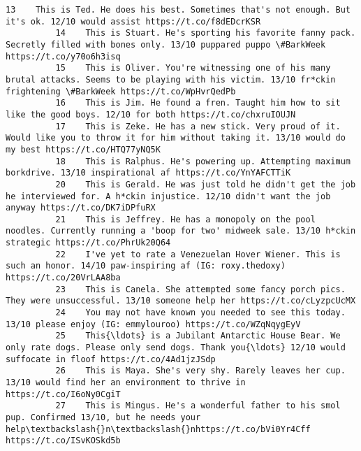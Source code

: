 \documentclass[11pt]{article}
\begin{document}
\begin{Verbatim}[commandchars=\\\{\}]
          13    This is Ted. He does his best. Sometimes that's not enough. But it's ok. 12/10 would assist https://t.co/f8dEDcrKSR                                                      
          14    This is Stuart. He's sporting his favorite fanny pack. Secretly filled with bones only. 13/10 puppared puppo \#BarkWeek https://t.co/y70o6h3isq                           
          15    This is Oliver. You're witnessing one of his many brutal attacks. Seems to be playing with his victim. 13/10 fr*ckin frightening \#BarkWeek https://t.co/WpHvrQedPb       
          16    This is Jim. He found a fren. Taught him how to sit like the good boys. 12/10 for both https://t.co/chxruIOUJN                                                           
          17    This is Zeke. He has a new stick. Very proud of it. Would like you to throw it for him without taking it. 13/10 would do my best https://t.co/HTQ77yNQ5K                 
          18    This is Ralphus. He's powering up. Attempting maximum borkdrive. 13/10 inspirational af https://t.co/YnYAFCTTiK                                                          
          20    This is Gerald. He was just told he didn't get the job he interviewed for. A h*ckin injustice. 12/10 didn't want the job anyway https://t.co/DK7iDPfuRX                  
          21    This is Jeffrey. He has a monopoly on the pool noodles. Currently running a 'boop for two' midweek sale. 13/10 h*ckin strategic https://t.co/PhrUk20Q64                  
          22    I've yet to rate a Venezuelan Hover Wiener. This is such an honor. 14/10 paw-inspiring af (IG: roxy.thedoxy) https://t.co/20VrLAA8ba                                     
          23    This is Canela. She attempted some fancy porch pics. They were unsuccessful. 13/10 someone help her https://t.co/cLyzpcUcMX                                              
          24    You may not have known you needed to see this today. 13/10 please enjoy (IG: emmylouroo) https://t.co/WZqNqygEyV                                                         
          25    This{\ldots} is a Jubilant Antarctic House Bear. We only rate dogs. Please only send dogs. Thank you{\ldots} 12/10 would suffocate in floof https://t.co/4Ad1jzJSdp                
          26    This is Maya. She's very shy. Rarely leaves her cup. 13/10 would find her an environment to thrive in https://t.co/I6oNy0CgiT                                            
          27    This is Mingus. He's a wonderful father to his smol pup. Confirmed 13/10, but he needs your help\textbackslash{}n\textbackslash{}nhttps://t.co/bVi0Yr4Cff https://t.co/ISvKOSkd5b                      

\end{Verbatim}
\end{document}
